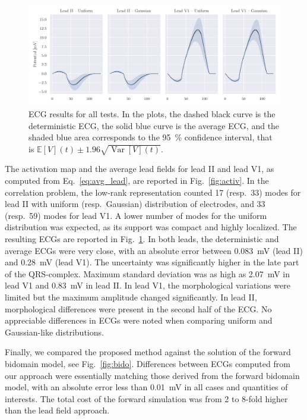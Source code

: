 \documentclass[runningheads]{llncs}
\newcommand{\EE}{\mathbb{E}}
\DeclareMathOperator{\Var}{Var}
\begin{document}
\begin{figure}[tb]
    \centering
    \includegraphics[width=\textwidth,trim=10 10 10 10,clip]{ECGcomp.pdf}
    \caption{ECG results for all tests. In the plots, the dashed black curve
    is the deterministic ECG, the solid blue curve is the average
    ECG, and the shaded blue area corresponds to the \SI{95}{\percent} confidence
    interval, that is $\EE[V](t) \pm 1.96\sqrt{\Var[V](t)}$.}
    \label{fig:results}
\end{figure}

The activation map and the average lead fields for lead II and lead V1, as computed from Eq.~\eqref{eq:avg_lead}, are reported in Fig.~\ref{fig:activ}.
In the correlation problem, the low-rank representation counted 17 (resp.~33) modes for lead II with uniform (resp.~Gaussian) distribution of electrodes, and 33 (resp.~59) modes for lead V1. A lower number of modes for the uniform distribution was expected, as its support was compact and highly localized.
The resulting ECGs are reported in Fig.~\ref{fig:results}.  In both leads, the deterministic and average ECGs were very close, with an absolute error between \SI{0.083}{\milli\volt} (lead II) and
\SI{0.28}{\milli\volt} (lead V1). The uncertainty was significantly higher in the late part of the QRS-complex. Maximum standard deviation was as high as \SI{2.07}{\milli\volt} in lead V1 and \SI{0.83}{\milli\volt} in lead II.  In lead V1, the morphological variations were limited but the
maximum amplitude changed significantly. In lead II, morphological differences were present in the second half of the ECG.  No appreciable differences in ECGs were noted when comparing uniform and Gaussian-like distributions.  

Finally, we compared the proposed method against
the solution of the forward bidomain model, see Fig.~\ref{fig:bido}.  Differences between ECGs computed from our approach were essentially matching those derived from the forward bidomain model, with an absolute error less than \SI{0.01}{\milli\volt} in all cases and quantities of interests. The total cost of the forward simulation was from 2 to 8-fold higher than the lead field approach.
\end{document}
